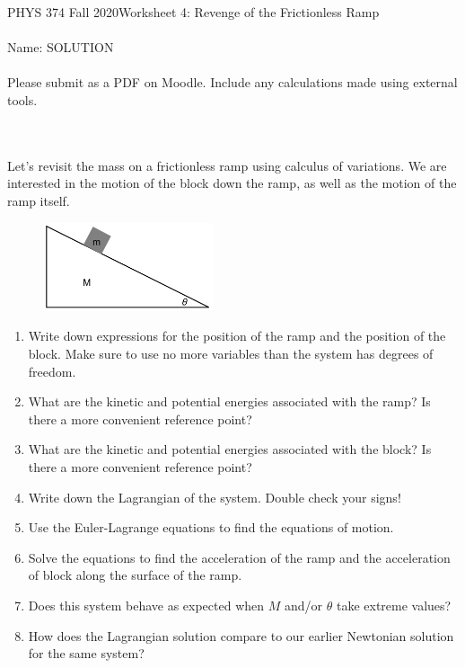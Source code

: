 \documentclass[12pt]{article}
\newcommand{\purple}[1]{{\color{purple} #1}}
\begin{document}
PHYS 374 Fall 2020\hfill Worksheet 4: Revenge of the Frictionless Ramp\\
\\
Name: \purple{SOLUTION} \\
\\
Please submit as a PDF on Moodle. Include any calculations made using external tools.

\hrulefill
\\
\\
Let's revisit the mass on a frictionless ramp using calculus of variations. We are interested in the motion of the block down the ramp, as well as the motion of the ramp itself. 
\begin{figure}[h]
\includegraphics[width=5cm]{Diagram.pdf}
\centering
\end{figure}
\begin{enumerate}
\item Write down expressions for the position of the ramp and the position of the block. Make sure to use no more variables than the system has degrees of freedom.
\item What are the kinetic and potential energies associated with the ramp? Is there a more convenient reference point?
\item What are the kinetic and potential energies associated with the block? Is there a more convenient reference point?
\item Write down the Lagrangian of the system. Double check your signs!
\item Use the Euler-Lagrange equations to find the equations of motion.
\item Solve the equations to find the acceleration of the ramp and the acceleration of block along the surface of the ramp.
\item Does this system behave as expected when $M$ and/or $\theta$ take extreme values?
\item How does the Lagrangian solution compare to our earlier Newtonian solution for the same system?
\end{enumerate}
\end{document}
